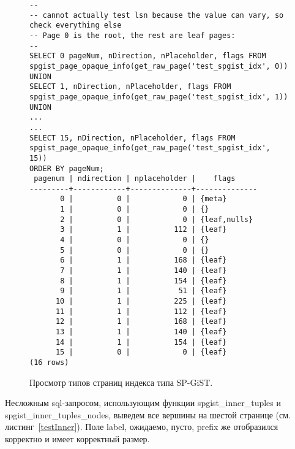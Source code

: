 \documentclass[12pt,oneside]{amsart}
\begin{document}
\begin{figure}[ht]
\begin{lstlisting}
--
-- cannot actually test lsn because the value can vary, so check everything else
-- Page 0 is the root, the rest are leaf pages:
--
SELECT 0 pageNum, nDirection, nPlaceholder, flags FROM spgist_page_opaque_info(get_raw_page('test_spgist_idx', 0)) UNION
SELECT 1, nDirection, nPlaceholder, flags FROM spgist_page_opaque_info(get_raw_page('test_spgist_idx', 1)) UNION
...
...
SELECT 15, nDirection, nPlaceholder, flags FROM spgist_page_opaque_info(get_raw_page('test_spgist_idx', 15))
ORDER BY pageNum;
 pagenum | ndirection | nplaceholder |    flags
---------+------------+--------------+--------------
       0 |          0 |            0 | {meta}
       1 |          0 |            0 | {}
       2 |          0 |            0 | {leaf,nulls}
       3 |          1 |          112 | {leaf}
       4 |          0 |            0 | {}
       5 |          0 |            0 | {}
       6 |          1 |          168 | {leaf}
       7 |          1 |          140 | {leaf}
       8 |          1 |          154 | {leaf}
       9 |          1 |           51 | {leaf}
      10 |          1 |          225 | {leaf}
      11 |          1 |          112 | {leaf}
      12 |          1 |          168 | {leaf}
      13 |          1 |          140 | {leaf}
      14 |          1 |          154 | {leaf}
      15 |          0 |            0 | {leaf}
(16 rows)
\end{lstlisting}
\caption{Просмотр типов страниц индекса типа SP-GiST.}\label{test_info}
\end{figure}

Несложным sql-запросом, использующим функции spgist\_inner\_tuples и spgist\_inner\_tuples\_nodes, выведем все вершины на шестой странице (см. листинг~\ref{testInner}). Поле label, ожидаемо, пусто, prefix же отобразился корректно и имеет корректный размер.
\end{document}
